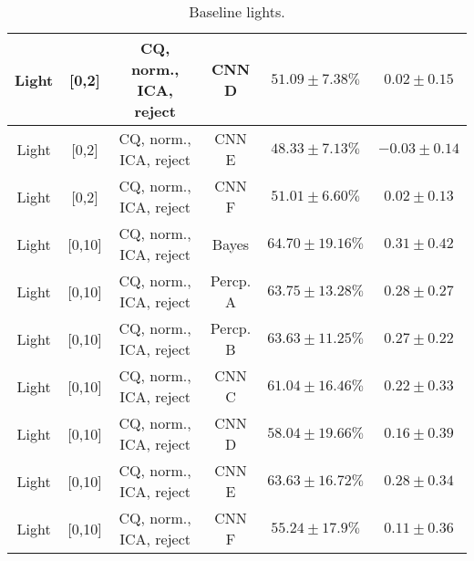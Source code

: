 \begin{table}[!htb]
{\begin{tabular}{c|c|c|c|c|c}
    \hline
    Light               & [0,2]                                         & CQ, norm., ICA, reject    & CNN D                 &  $51.09 \pm 7.38\%$   & $0.02 \pm 0.15$\\  
    \hline
    Light               & [0,2]                                         & CQ, norm., ICA, reject    & CNN E                 &  $48.33 \pm 7.13\%$   & $-0.03 \pm 0.14$\\  
    \hline
    Light               & [0,2]                                         & CQ, norm., ICA, reject    & CNN F                 &  $51.01 \pm 6.60\%$    & $0.02 \pm 0.13$\\  
    \hline
    Light               & [0,10]                                        & CQ, norm., ICA, reject    & Bayes                 &  $64.70 \pm 19.16\%$  & $0.31 \pm 0.42$\\   
    \hline
    Light               & [0,10]                                        & CQ, norm., ICA, reject    & Percp. A              &  $63.75 \pm 13.28\%$  & $0.28 \pm 0.27$\\   
    \hline
    Light               & [0,10]                                        & CQ, norm., ICA, reject    & Percp. B              &  $63.63 \pm 11.25\%$  & $0.27 \pm 0.22$\\   
    \hline
    Light               & [0,10]                                        & CQ, norm., ICA, reject    & CNN C                 &  $61.04 \pm 16.46\%$  & $0.22 \pm 0.33$\\   
    \hline
    Light               & [0,10]                                        & CQ, norm., ICA, reject    & CNN D                 &  $58.04 \pm 19.66\%$  & $0.16 \pm 0.39$\\   
    \hline
    Light               & [0,10]                                        & CQ, norm., ICA, reject    & CNN E                 &  $63.63 \pm 16.72\%$  & $0.28 \pm 0.34$\\  
    \hline
    Light               & [0,10]                                        & CQ, norm., ICA, reject    & CNN F                 &  $55.24 \pm 17.9\%$   & $0.11 \pm 0.36$\\  
    \hline
\end{tabular}
}
\caption{Baseline lights.}
\label{tab:lights-baseline+reject-app}
\end{table}